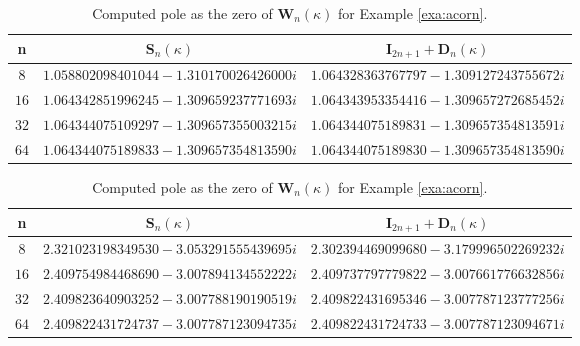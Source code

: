 \documentclass{article}
\renewcommand{\vec}[1]{\boldsymbol{#1}}
\renewcommand{\vec}[1]{\boldsymbol{#1}}
\begin{document}
	
	\begin{center}
		\begin{table}[h!]
			\caption{Computed pole as the zero of $\vec{W}_n(\kappa)$ for Example \ref{exa:acorn}. }
			\label{Acorn1}
			\begin{center}
				\small
				\begin{tabular}{c|c|c}
					\hline
					n	&   $\vec{S}_n(\kappa)$ &  $\vec{I}_{2n+1}+\vec{D}_n(\kappa)$\\
					\hline
					$8$ & $ 1.058802098401044 - 1.310170026426000i$& $1.064328363767797 - 1.309127243755672i$\\
					\hline
					$16$ & $1.064342851996245 - 1.309659237771693i$& $1.064343953354416 - 1.309657272685452i$ \\
					\hline
					$32$ & $1.064344075109297 - 1.309657355003215i$&$1.064344075189831 - 1.309657354813591i$ \\
					\hline
					$64$ & $1.064344075189833 - 1.309657354813590i$& $1.064344075189830 - 1.309657354813590i$\\
					\hline
				\end{tabular}
			\end{center}
		\end{table}
	\end{center}
	
	\begin{center}
		\begin{table}[h!]
			\caption{Computed pole as the zero of $\vec{W}_n(\kappa)$ for Example \ref{exa:acorn}. }
			\label{Acorn2}
			\begin{center}
				\small
				\begin{tabular}{c|c|c}
					\hline
					n	&   $\vec{S}_n(\kappa)$ &  $\vec{I}_{2n+1}+\vec{D}_n(\kappa)$\\
					\hline
					$8$ & $2.321023198349530 - 3.053291555439695i$& $2.302394469099680 - 3.179996502269232i$\\
					\hline
					$16$ & $2.409754984468690 - 3.007894134552222i$& $2.409737797779822 - 3.007661776632856i$ \\
					\hline
					$32$ & $2.409823640903252 - 3.007788190190519i$&$2.409822431695346 - 3.007787123777256i$ \\
					\hline
					$64$ & $2.409822431724737 - 3.007787123094735i$& $2.409822431724733 - 3.007787123094671i$\\
					\hline
				\end{tabular}
			\end{center}
		\end{table}
	\end{center}
	
\end{document}
